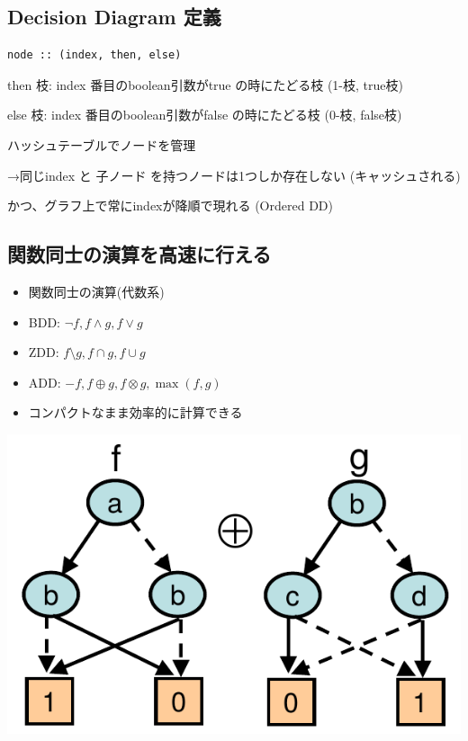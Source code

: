 \subsection{Decision Diagram 定義}
\label{sec-4-6}

\begin{verbatim}
node :: (index, then, else)
\end{verbatim}

then 枝: index 番目のboolean引数がtrue の時にたどる枝 (1-枝, true枝)

else 枝: index 番目のboolean引数がfalse の時にたどる枝 (0-枝, false枝)

ハッシュテーブルでノードを管理

→同じindex と 子ノード を持つノードは1つしか存在しない (キャッシュされる)

かつ、グラフ上で常にindexが降順で現れる (Ordered DD)

\subsection{関数同士の演算を高速に行える}
\label{sec-4-7}

\begin{container-fluid}
\begin{row-fluid}
\begin{span6}
\begin{itemize}
\item 関数同士の演算(代数系)
\item BDD: $\neg f, f\land g, f\lor g$
\item ZDD: $f \setminus g, f\cap g, f\cup g$
\item ADD: $-f, f\oplus g, f\otimes g, \max (f,g)$
\item コンパクトなまま効率的に計算できる
\end{itemize}
\end{span6}
\begin{span6}
\includegraphics{img/static/dd-operation.png}
\end{span6}
\end{row-fluid}
\end{container-fluid}

